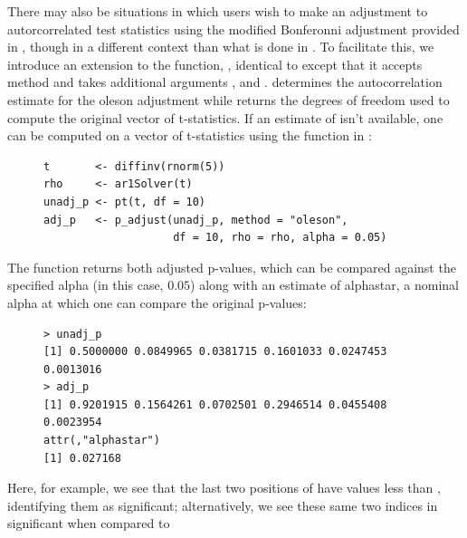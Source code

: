 There may also be situations in which users wish to make an adjustment to autorcorrelated test statistics using the modified Bonferonni adjustment provided in \cite{oleson2017detecting}, though in a different context than what is done in . To facilitate this, we introduce an extension to the  function, , identical to  except that it accepts method  and takes additional arguments , and .  determines the autocorrelation estimate for the oleson adjustment while  returns the degrees of freedom used to compute the original vector of t-statistics. If an estimate of  isn't available, one can be computed on a vector of t-statistics using the  function in :


\begin{singlespace}
\begin{figure}[H]
\centering
\begin{BVerbatim}
t       <- diffinv(rnorm(5))
rho     <- ar1Solver(t)
unadj_p <- pt(t, df = 10)
adj_p   <- p_adjust(unadj_p, method = "oleson", 
                    df = 10, rho = rho, alpha = 0.05)
\end{BVerbatim}
\end{figure}
\end{singlespace}

The  function returns both adjusted p-values, which can be compared against the specified alpha (in this case, $0.05$) along with an estimate of alphastar, a nominal alpha at which one can compare the original p-values:

\begin{singlespace}
\begin{figure}[H]
\centering
\begin{BVerbatim}
> unadj_p
[1] 0.5000000 0.0849965 0.0381715 0.1601033 0.0247453 0.0013016
> adj_p
[1] 0.9201915 0.1564261 0.0702501 0.2946514 0.0455408 0.0023954
attr(,"alphastar")
[1] 0.027168
\end{BVerbatim}
\end{figure}
\end{singlespace}

Here, for example, we see that the last two positions of  have values less than , identifying them as significant; alternatively, we see these same two indices in  significant when compared to 

